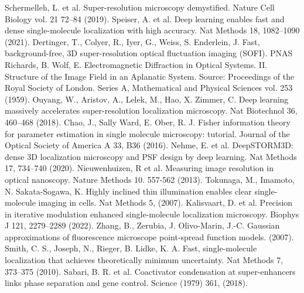 \documentclass{ucetd}
\begin{document}
\noindent [1] Schermelleh, L. et al. Super-resolution microscopy demystified. Nature Cell Biology vol. 21 72–84 (2019). 
\newline
\noindent [2] Speiser, A. et al. Deep learning enables fast and dense single-molecule localization with high accuracy. Nat Methods 18, 1082–1090 (2021).
\newline
\noindent [3] Dertinger, T., Colyer, R., Iyer, G., Weiss, S. Enderlein, J. Fast, background-free, 3D super-resolution optical fluctuation imaging (SOFI). PNAS
\newline
\noindent [4] Richards, B. Wolf, E. Electromagnetic Diffraction in Optical Systems. II. Structure of the Image Field in an Aplanatic System. Source: Proceedings of the Royal Society of London. Series A, Mathematical and Physical Sciences vol. 253 (1959). 
\newline
\noindent [5] Ouyang, W., Aristov, A., Lelek, M., Hao, X. Zimmer, C. Deep learning massively accelerates super-resolution localization microscopy. Nat Biotechnol 36, 460–468 (2018). 
\newline
\noindent [6] Chao, J., Sally Ward, E. Ober, R. J. Fisher information theory for parameter estimation in single molecule microscopy: tutorial. Journal of the Optical Society of America A 33, B36 (2016). 
\newline
\noindent [7] Nehme, E. et al. DeepSTORM3D: dense 3D localization microscopy and PSF design by deep learning. Nat Methods 17, 734–740 (2020). 
\newline
\noindent [8] Nieuwenhuizen, R et al. Measuring image resolution in optical nanoscopy. Nature Methods 10. 557-562 (2013). 
\noindent [9] Tokunaga, M., Imamoto, N. Sakata-Sogawa, K. Highly inclined thin illumination enables clear single-molecule imaging in cells. Nat Methods 5, (2007). 
\newline
\noindent [10] Kalisvaart, D. et al. Precision in iterative modulation enhanced single-molecule localization microscopy. Biophys J 121, 2279–2289 (2022). 
\newline
\noindent [11] Zhang, B., Zerubia, J. Olivo-Marin, J.-C. Gaussian approximations of fluorescence microscope point-spread function models. (2007). 
\newline
\noindent [12] Smith, C. S., Joseph, N., Rieger, B. Lidke, K. A. Fast, single-molecule localization that achieves theoretically minimum uncertainty. Nat Methods 7, 373–375 (2010). 
\newline
\noindent [13] Sabari, B. R. et al. Coactivator condensation at super-enhancers links phase separation and gene control. Science (1979) 361, (2018). 
\end{document}
